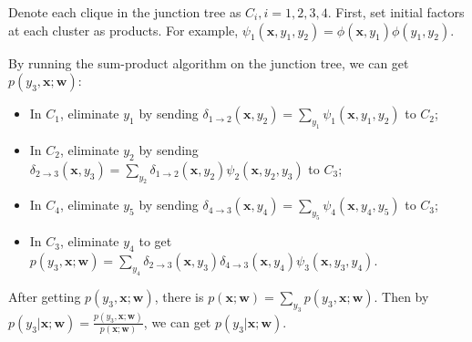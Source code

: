 \documentclass[12pt]{article}
\begin{document}
\par
Denote each clique in the junction tree as $C_i,i=1,2,3,4$. First, set initial factors at each cluster as products. For example, $\psi_1(\bm{x},y_1,y_2)=\phi(\bm{x},y_1)\phi(y_1,y_2)$.
\par
By running the sum-product algorithm on the junction tree, we can get $p(y_3,\bm x;\bm w)$:
\begin{itemize}
\item In $C_1$, eliminate $y_1$ by sending $\delta_{1\rightarrow2}(\bm{x},y_2)=\sum_{y_1}\psi_1(\bm{x},y_1,y_2)$ to $C_2$;
\item In $C_2$, eliminate $y_2$ by sending $\delta_{2\rightarrow3}(\bm{x},y_3)=\sum_{y_2}\delta_{1\rightarrow2}(\bm{x},y_2)\psi_2(\bm{x},y_2,y_3)$ to $C_3$;
\item In $C_4$, eliminate $y_5$ by sending $\delta_{4\rightarrow3}(\bm{x},y_4)=\sum_{y_5}\psi_4(\bm{x},y_4,y_5)$ to $C_3$;
\item In $C_3$, eliminate $y_4$ to get $p(y_3,\bm x;\bm w)=\sum_{y_4}\delta_{2\rightarrow3}(\bm{x},y_3)\delta_{4\rightarrow3}(\bm{x},y_4)\psi_3(\bm{x},y_3,y_4)$.
\end{itemize}
After getting $p(y_3,\bm x;\bm w)$, there is $p(\bm x;\bm w)=\sum_{y_3}p(y_3,\bm x;\bm w)$. Then by $p(y_3|\bm x;\bm w)=\frac{p(y_3,\bm x;\bm w)}{p(\bm x;\bm w)}$, we can get $p(y_3|\bm x;\bm w)$.
\end{document}
